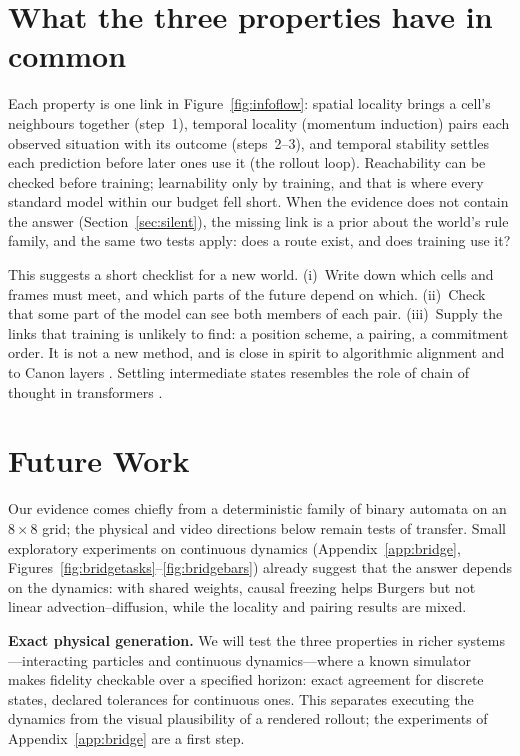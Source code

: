 \documentclass[11pt]{article}
\begin{document}
\section{What the three properties have in common}
\label{sec:common}

Each property is one link in Figure~\ref{fig:infoflow}: spatial locality brings a cell's neighbours together (step~1), temporal locality (momentum induction) pairs each observed situation with its outcome (steps~2--3), and temporal stability settles each prediction before later ones use it (the rollout loop). Reachability can be checked before training; learnability only by training, and that is where every standard model within our budget fell short. When the evidence does not contain the answer (Section~\ref{sec:silent}), the missing link is a prior about the world's rule family, and the same two tests apply: does a route exist, and does training use it?

This suggests a short checklist for a new world. (i)~Write down which cells and frames must meet, and which parts of the future depend on which. (ii)~Check that some part of the model can see both members of each pair. (iii)~Supply the links that training is unlikely to find: a position scheme, a pairing, a commitment order. It is not a new method, and is close in spirit to algorithmic alignment \citep{xu2020reason} and to Canon layers \citep{allenzhu2025canon}. Settling intermediate states resembles the role of chain of thought in transformers \citep{feng2023cot, merrill2024cot}.

\section{Future Work}
\label{sec:outlook}

Our evidence comes chiefly from a deterministic family of binary automata on an $8\times8$ grid; the physical and video directions below remain tests of transfer. Small exploratory experiments on continuous dynamics (Appendix~\ref{app:bridge}, Figures~\ref{fig:bridgetasks}--\ref{fig:bridgebars}) already suggest that the answer depends on the dynamics: with shared weights, causal freezing helps Burgers but not linear advection--diffusion, while the locality and pairing results are mixed.

\textbf{Exact physical generation.} We will test the three properties in richer systems---interacting particles and continuous dynamics---where a known simulator makes fidelity checkable over a specified horizon: exact agreement for discrete states, declared tolerances for continuous ones. This separates executing the dynamics from the visual plausibility of a rendered rollout; the experiments of Appendix~\ref{app:bridge} are a first step.
\end{document}
